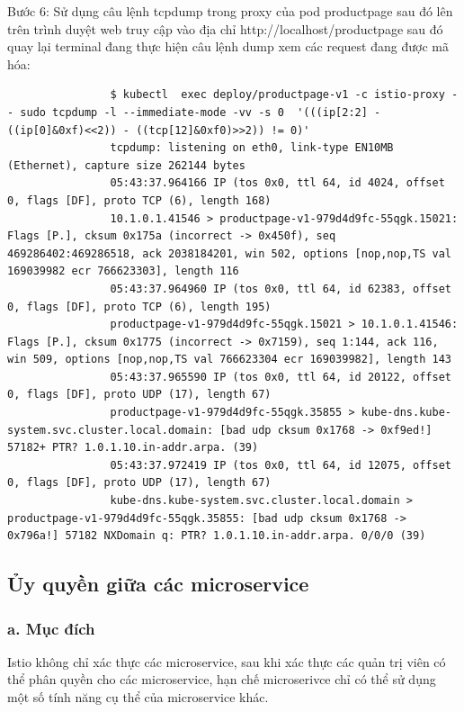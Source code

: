\documentclass[14pt,a4paper]{book}
\begin{document}
{{				Bước 6: Sử dụng câu lệnh tcpdump trong proxy của pod productpage sau đó lên trên trình duyệt web truy cập vào địa chỉ http://localhost/productpage sau đó quay lại terminal đang thực hiện câu lệnh dump xem các request đang được mã hóa:
				\begin{lstlisting}
				$ kubectl  exec deploy/productpage-v1 -c istio-proxy -- sudo tcpdump -l --immediate-mode -vv -s 0  '(((ip[2:2] - ((ip[0]&0xf)<<2)) - ((tcp[12]&0xf0)>>2)) != 0)'
				tcpdump: listening on eth0, link-type EN10MB (Ethernet), capture size 262144 bytes
				05:43:37.964166 IP (tos 0x0, ttl 64, id 4024, offset 0, flags [DF], proto TCP (6), length 168)
				10.1.0.1.41546 > productpage-v1-979d4d9fc-55qgk.15021: Flags [P.], cksum 0x175a (incorrect -> 0x450f), seq 469286402:469286518, ack 2038184201, win 502, options [nop,nop,TS val 169039982 ecr 766623303], length 116
				05:43:37.964960 IP (tos 0x0, ttl 64, id 62383, offset 0, flags [DF], proto TCP (6), length 195)
				productpage-v1-979d4d9fc-55qgk.15021 > 10.1.0.1.41546: Flags [P.], cksum 0x1775 (incorrect -> 0x7159), seq 1:144, ack 116, win 509, options [nop,nop,TS val 766623304 ecr 169039982], length 143
				05:43:37.965590 IP (tos 0x0, ttl 64, id 20122, offset 0, flags [DF], proto UDP (17), length 67)
				productpage-v1-979d4d9fc-55qgk.35855 > kube-dns.kube-system.svc.cluster.local.domain: [bad udp cksum 0x1768 -> 0xf9ed!] 57182+ PTR? 1.0.1.10.in-addr.arpa. (39)
				05:43:37.972419 IP (tos 0x0, ttl 64, id 12075, offset 0, flags [DF], proto UDP (17), length 67)
				kube-dns.kube-system.svc.cluster.local.domain > productpage-v1-979d4d9fc-55qgk.35855: [bad udp cksum 0x1768 -> 0x796a!] 57182 NXDomain q: PTR? 1.0.1.10.in-addr.arpa. 0/0/0 (39)
				\end{lstlisting}
				
				
		\subsection{Ủy quyền giữa các microservice}
			\subsubsection{a. Mục đích}
			{\hspace{0.6cm}Istio không chỉ xác thực các microservice, sau khi xác thực các quản trị viên có thể phân quyền cho các microservice, hạn chế microserivce chỉ có thể sử dụng một số tính năng cụ thể của microservice khác.}
}}
\end{document}
